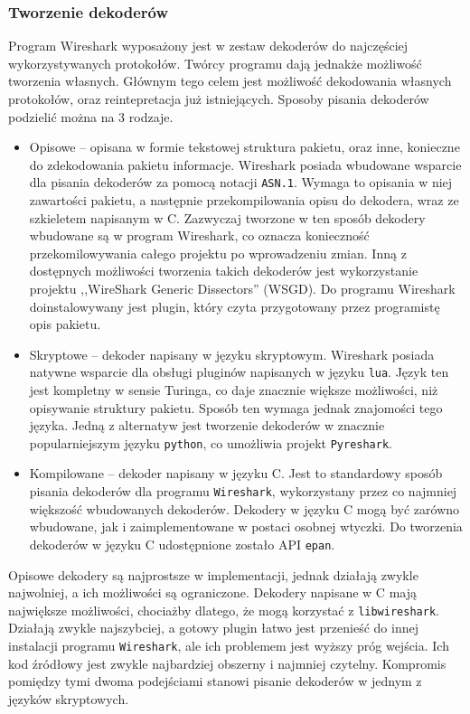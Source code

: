 \documentclass[a4paper, 12pt, twoside, openright]{article}
\begin{document}
	\subsubsection{Tworzenie dekoderów}
	\indent\par
	Program Wireshark wyposażony jest w zestaw dekoderów do najczęściej wykorzystywanych protokołów. Twórcy programu
	dają jednakże możliwość tworzenia własnych. Głównym tego celem jest możliwość
	dekodowania własnych protokołów, oraz reintepretacja już istniejących. Sposoby pisania dekoderów podzielić można na 3 rodzaje.
	\begin{itemize}
		\item Opisowe -- opisana w formie tekstowej struktura pakietu, oraz inne, konieczne do zdekodowania pakietu informacje.
			Wireshark posiada wbudowane wsparcie dla pisania dekoderów za pomocą notacji \texttt{ASN.1}. Wymaga to opisania
			w niej zawartości pakietu, a następnie przekompilowania opisu do dekodera, wraz ze szkieletem napisanym w C.
			Zazwyczaj tworzone w ten sposób dekodery wbudowane są w program Wireshark, co oznacza konieczność przekomilowywania
			całego projektu po wprowadzeniu zmian.
			Inną z dostępnych możliwości tworzenia takich dekoderów jest wykorzystanie projektu ,,WireShark Generic Dissectors'' (WSGD).
			Do programu Wireshark doinstalowywany jest plugin, który czyta przygotowany przez programistę opis pakietu.
		\item Skryptowe -- dekoder napisany w języku skryptowym. Wireshark posiada natywne wsparcie dla obsługi pluginów
			napisanych w języku \texttt{lua}. Język ten jest kompletny w sensie Turinga, co daje znacznie większe możliwości,
			niż opisywanie struktury pakietu. Sposób ten wymaga jednak znajomości tego języka. Jedną z alternatyw jest tworzenie
			dekoderów w znacznie popularniejszym języku \texttt{python}, co umożliwia projekt \texttt{Pyreshark}.
		\item Kompilowane -- dekoder napisany w języku C. Jest to standardowy sposób pisania dekoderów dla programu \texttt{Wireshark},
			wykorzystany przez co najmniej większość wbudowanych dekoderów. Dekodery w języku C mogą być zarówno wbudowane,
			jak i zaimplementowane w postaci osobnej wtyczki. Do tworzenia dekoderów w języku C udostępnione zostało API \texttt{epan}.
	\end{itemize}

	Opisowe dekodery są najprostsze w implementacji, jednak działają zwykle najwolniej, a ich możliwości są ograniczone.
	Dekodery napisane w C mają największe możliwości, chociażby dlatego, że mogą korzystać z \texttt{libwireshark}. Działają zwykle
	najszybciej, a gotowy plugin łatwo jest przenieść do innej instalacji programu \texttt{Wireshark}, ale ich problemem jest wyższy próg wejścia.
	Ich kod źródłowy jest zwykle najbardziej obszerny i najmniej czytelny. Kompromis pomiędzy tymi dwoma podejściami
	stanowi pisanie dekoderów w jednym z języków skryptowych.
\end{document}
